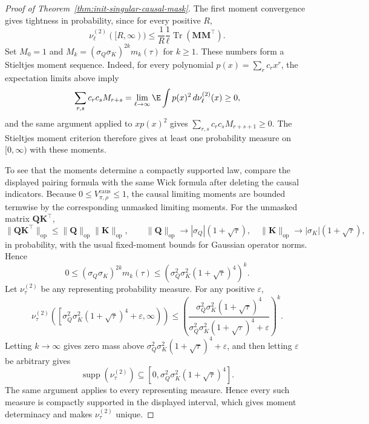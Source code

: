 \documentclass{article}
\newcommand{\op}{\operatorname{op}}
\newcommand{\bM}{\mathbf{M}}
\newcommand{\bQ}{\mathbf{Q}}
\newcommand{\bK}{\mathbf{K}}
\theoremstyle{definition}
\theoremstyle{remark}
\begin{document}
\begin{proof}[Proof of Theorem~\ref{thm:init-singular-causal-mask}]
The first moment convergence gives tightness in probability, since for every
positive $R$,
\[
    \nu_{\ell}^{(2)}([R,\infty))
    \leq
    \frac1R\frac1\ell\operatorname{Tr}(\bM\bM^\top).
\]
Set $M_0=1$ and
$M_k=(\sigma_Q\sigma_K)^{2k}m_k(\tau)$ for $k\geq1$.  These numbers form a
Stieltjes moment sequence.  Indeed, for every polynomial
$p(x)=\sum_r c_rx^r$, the expectation limits above imply
\[
    \sum_{r,s}c_rc_sM_{r+s}
    =\lim_{\ell\to\infty}\E\int p(x)^2\,d\nu_\ell^{(2)}(x)\geq0,
\]
and the same argument applied to $xp(x)^2$ gives
$\sum_{r,s}c_rc_sM_{r+s+1}\geq0$.  The Stieltjes moment criterion therefore
gives at least one probability measure on $[0,\infty)$ with these moments.

To see that the moments determine a compactly supported law, compare the
displayed pairing formula with the same Wick formula after deleting the causal
indicators.  Because $0\leq V_{\pi,\rho}^{\mathrm{caus}}\leq1$, the causal
limiting moments are bounded termwise by the corresponding unmasked limiting
moments.  For the unmasked matrix $\bQ\bK^\top$,
\[
    \|\bQ\bK^\top\|_{\op}
    \leq
    \|\bQ\|_{\op}\|\bK\|_{\op},
    \qquad
    \|\bQ\|_{\op}\longrightarrow |\sigma_Q|(1+\sqrt\tau),
    \quad
    \|\bK\|_{\op}\longrightarrow |\sigma_K|(1+\sqrt\tau),
\]
in probability, with the usual fixed-moment bounds for Gaussian operator norms.
Hence
\[
    0\leq
    (\sigma_Q\sigma_K)^{2k}m_k(\tau)
    \leq
    \left(\sigma_Q^2\sigma_K^2(1+\sqrt\tau)^4\right)^k.
\]
Let $\nu_{\tau}^{(2)}$ be any representing probability measure.  For any
positive $\varepsilon$,
\[
    \nu_{\tau}^{(2)}\left(
    \left[\sigma_Q^2\sigma_K^2(1+\sqrt\tau)^4+\varepsilon,\infty\right)
    \right)
    \leq
    \left(
    \frac{\sigma_Q^2\sigma_K^2(1+\sqrt\tau)^4}
    {\sigma_Q^2\sigma_K^2(1+\sqrt\tau)^4+\varepsilon}
    \right)^k.
\]
Letting $k\to\infty$ gives zero mass above
$\sigma_Q^2\sigma_K^2(1+\sqrt\tau)^4+\varepsilon$, and then letting
$\varepsilon$ be arbitrary gives
\[
    \operatorname{supp}(\nu_{\tau}^{(2)})
    \subseteq
    \left[0,\sigma_Q^2\sigma_K^2(1+\sqrt\tau)^4\right].
\]
The same argument applies to every representing measure.  Hence every such
measure is compactly supported in the displayed interval, which gives moment
determinacy and makes $\nu_{\tau}^{(2)}$ unique.


\end{proof}
\end{document}
